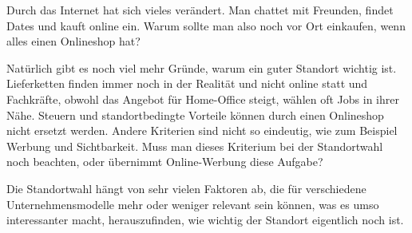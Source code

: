\begin{refsection}
  
  
  Durch das Internet hat sich vieles verändert. Man chattet mit Freunden, findet Dates und kauft online ein. Warum sollte man also noch vor Ort einkaufen, wenn alles einen Onlineshop hat?

  Natürlich gibt es noch viel mehr Gründe, warum ein guter Standort wichtig ist. Lieferketten finden immer noch in der Realität und nicht online statt und Fachkräfte, obwohl das Angebot für Home-Office steigt, wählen oft Jobs in ihrer Nähe. Steuern und standortbedingte Vorteile können durch einen Onlineshop nicht ersetzt werden. Andere Kriterien sind nicht so eindeutig, wie zum Beispiel Werbung und Sichtbarkeit. Muss man dieses Kriterium bei der Standortwahl noch beachten, oder übernimmt Online-Werbung diese Aufgabe?

  Die Standortwahl hängt von sehr vielen Faktoren ab, die für verschiedene Unternehmensmodelle mehr oder weniger relevant sein können, was es umso interessanter macht, herauszufinden, wie wichtig der Standort eigentlich noch ist.
  \clearpage
  \printbibliography[heading=subsubbibliography]
\end{refsection}
\clearpage
